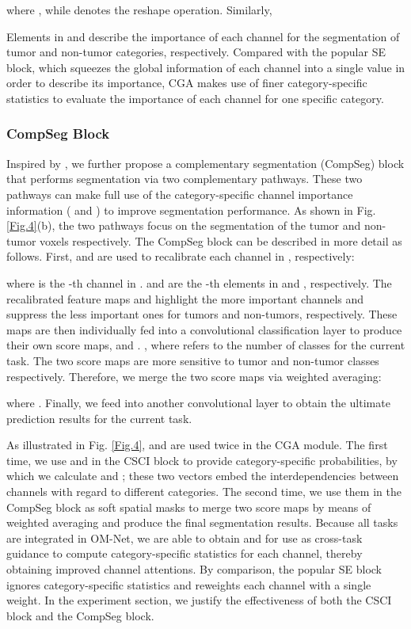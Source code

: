 \documentclass[journal,twoside]{IEEEtran}
\begin{document}
where , while  denotes the reshape operation.
Similarly,

Elements in  and  describe the importance of each channel for the segmentation of tumor and non-tumor categories, respectively. Compared with the popular SE block, which squeezes the global information of each channel into a single value in order to describe its importance, CGA makes use of finer category-specific statistics to evaluate the importance of each channel for one specific category.





\subsubsection{CompSeg Block} 
Inspired by \cite {dey2018compnet}, we further propose a complementary segmentation (CompSeg) block that performs segmentation via two complementary pathways. These two pathways can make full use of the category-specific channel importance information ( and ) to improve segmentation performance. As shown in Fig. \ref{Fig.4}(b), the two pathways focus on the segmentation of the tumor and non-tumor voxels respectively. The CompSeg block can be described in more detail as follows. First,  and  are used to recalibrate each channel in , respectively: 


where  is the -th channel in .  and  are the -th elements in  and , respectively. The recalibrated feature maps  and  highlight the more important channels and suppress the less important ones for tumors and non-tumors, respectively. These maps are then individually fed into a  convolutional classification layer to produce their own score maps,  and . , where  refers to the number of classes for the current task. The two score maps are more sensitive to tumor and non-tumor classes respectively. Therefore, we merge the two score maps via weighted averaging:

where . Finally, we feed  into another   convolutional layer to obtain the ultimate prediction results  for the current task. 




As illustrated in Fig. \ref{Fig.4},  and  are used twice in the CGA module. 
The first time, we use  and  in the CSCI block to provide category-specific probabilities, by which we calculate  and ; these two vectors embed the interdependencies between channels with regard to different categories. The second time, we use them in the CompSeg block as soft spatial masks to merge two score maps by means of weighted averaging and produce the final segmentation results. Because all tasks are integrated in OM-Net, we are able to obtain  and  for use as cross-task guidance to compute category-specific statistics for each channel, thereby obtaining improved channel attentions. By comparison, the popular SE block ignores category-specific statistics and reweights each channel with a single weight. In the experiment section, we justify the effectiveness of both the CSCI block and the CompSeg block.
\end{document}
